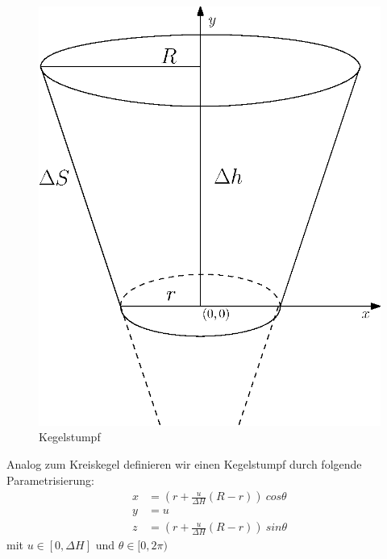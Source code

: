 \begin{figure}[!htb]
	\centering
	\includegraphics[scale=.7]{images/coneFrustum.eps}
	\caption{Kegelstumpf}
	\label{fig:coneFrustum}
\end{figure}

Analog zum Kreiskegel definieren wir einen Kegelstumpf durch folgende Parametrisierung: 
\begin{equation} \label{eq:paramFrustum}
\begin{aligned}
x &= (r + \frac{u}{\Delta H} (R - r))~cos \theta \\
y &= u \\
z &= (r + \frac{u}{\Delta H} (R - r))~sin \theta
\end{aligned}
\end{equation}
mit $u\in [0, \Delta H]$ und $\theta \in [0, 2\pi)$


